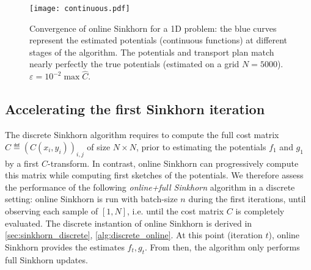     


\begin{figure*}[t]
    \centering
    \if{}
    \begin{widepage}
    \fi
    \texttt{[image: continuous.pdf]}
    \caption{Convergence of online Sinkhorn for a 1D problem: the blue curves represent the estimated potentials (continuous functions) at different stages of the algorithm. The potentials and transport plan match nearly perfectly the true potentials (estimated on a grid $N = 5000$). $\varepsilon = 10^{-2} \max \hat C$.
    \label{fig:potentials}
    }
    \if{}
    \end{widepage}
    \fi
\end{figure*}

\subsection{Accelerating the first Sinkhorn iteration}\label{sec:accelerating}

The discrete Sinkhorn algorithm requires to compute the full cost matrix $\hat C \eqdef
(C(x_i,y_i))_{i,j}$  of size $N \times N$, prior to estimating the
potentials $f_1$ and $g_1$ by a first $C$-transform. In contrast, online Sinkhorn can progressively
compute this matrix while computing first sketches of the potentials. We therefore
assess the performance of the following \textit{online+full Sinkhorn} algorithm
in a discrete setting: online Sinkhorn is run with batch-size $n$ during the first iterations, until
observing each sample of $[1,N]$, i.e. until the cost matrix $C$ is completely evaluated. The discrete instantion of online Sinkhorn is derived in \autoref{sec:sinkhorn_discrete}, \autoref{alg:discrete_online}. 
At this point (iteration $t$), online Sinkhorn provides the estimates $f_{t},
g_{t}$. From then, the algorithm only performs full Sinkhorn updates.


